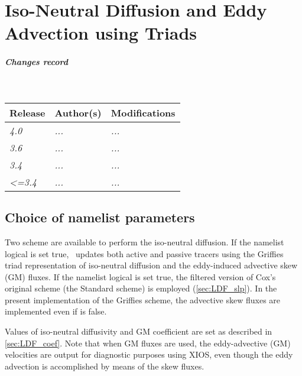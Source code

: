 \documentclass[../main/NEMO_manual]{subfiles}
\begin{document}
\chapter{Iso-Neutral Diffusion and Eddy Advection using Triads}
\label{apdx:TRIADS}

\chaptertoc

\paragraph{Changes record} ~\\

{\footnotesize
  \begin{tabularx}{\textwidth}{l||X|X}
    Release & Author(s) & Modifications \\
    \hline
    {\em   4.0} & {\em ...} & {\em ...} \\
    {\em   3.6} & {\em ...} & {\em ...} \\
    {\em   3.4} & {\em ...} & {\em ...} \\
    {\em <=3.4} & {\em ...} & {\em ...}
  \end{tabularx}
}

\clearpage

\section[Choice of \forcode{namtra_ldf} namelist parameters]{Choice of \protect{} namelist parameters}

Two scheme are available to perform the iso-neutral diffusion.
If the namelist logical  is set true,
\NEMO\ updates both active and passive tracers using the Griffies triad representation of iso-neutral diffusion and
the eddy-induced advective skew (GM) fluxes.
If the namelist logical  is set true,
the filtered version of Cox's original scheme (the Standard scheme) is employed (\autoref{sec:LDF_slp}).
In the present implementation of the Griffies scheme,
the advective skew fluxes are implemented even if  is false.

Values of iso-neutral diffusivity and GM coefficient are set as described in \autoref{sec:LDF_coef}.
Note that when GM fluxes are used, the eddy-advective (GM) velocities are output for diagnostic purposes using XIOS,
even though the eddy advection is accomplished by means of the skew fluxes.
\end{document}
